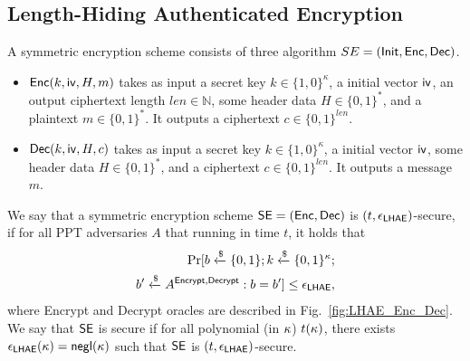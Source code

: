 \subsection{Length-Hiding Authenticated Encryption} \label{sec:SE}

A symmetric encryption scheme consists of three algorithm
$SE = (\mathsf{Init}, \mathsf{Enc}, \mathsf{Dec})$.
\begin{itemize}
 \item{$\mathsf{Enc}(k,\mathsf{iv},H,m)$ takes as input a secret key
 $k \in \{1,0\}^{\kappa}$, a initial vector $\mathsf{iv}$, an
 output ciphertext length $len \in \mathbb{N}$, some
 header data $H \in \{0,1\}^{\ast}$, and a plaintext
 $m \in \{0,1\}^{\ast}$.
 It outputs a ciphertext $c \in \{0,1\}^{len}$.}
 \item{$\mathsf{Dec}(k,\mathsf{iv},H,c)$ takes as input a secret key
 $k \in \{1,0\}^{\kappa}$, a initial vector $\mathsf{iv}$,
 some header data $H \in \{0,1\}^{\ast}$, and a
 ciphertext $c \in \{0,1\}^{len}$. It outputs a
 message $m$.}
\end{itemize}

\begin{definition}
 We say that a symmetric encryption scheme
 $\mathsf{SE} = (\mathsf{Enc},\mathsf{Dec})$ is $(t, \epsilon_{\mathsf{LHAE}})$-secure,
 if for all PPT adversaries $A$ that running in time
 $t$, it holds that
 \begin{eqnarray}
  \Pr[b\xleftarrow{\$}\{0,1\}; k\xleftarrow{\$}\{0,1\}^{\kappa}; \nonumber \\
   b^{\prime} \xleftarrow{\$} A^{\mathsf{Encrypt}, \mathsf{Decrypt}} : b = b^{\prime}] \leq \epsilon_{\mathsf{LHAE}},
 \end{eqnarray}
 where Encrypt and Decrypt oracles are described in
 Fig.~\ref{fig:LHAE_Enc_Dec}.
 We say that $\mathsf{SE}$ is secure if for all polynomial
 (in $\kappa$) $t(\kappa)$, there exists
 $\epsilon_{\mathsf{LHAE}}(\kappa)=\mathsf{negl}(\kappa)$ such that $\mathsf{SE}$
 is $(t, \epsilon_{\mathsf{LHAE}})$-secure.
\end{definition}

